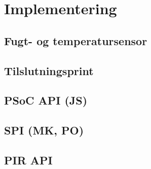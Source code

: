 \chapter{Implementering}


\section{Fugt- og temperatursensor}


\section{Tilslutningsprint}


\section{PSoC API (JS)}


\section{SPI (MK, PO)}


\section{PIR API}



